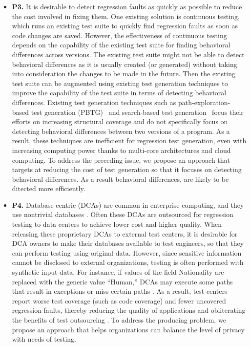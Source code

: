 \begin{itemize}
\item \textbf{P3.} It is desirable to detect regression faults as quickly as possible to reduce the cost involved in fixing them. 
One existing solution is continuous testing, which runs an existing test suite to quickly find regression faults as soon as code changes are saved. 
However, the effectiveness of continuous testing depends on the capability of the existing test suite for 
finding behavioral differences across versions. The existing test suite might not be able to detect behavioral differences as it is usually created (or generated) without taking into consideration the changes to be made in the future. Then the existing test suite can be augmented using existing test generation techniques to improve the capability of the test suite in terms of detecting behavioral differences. Existing test generation techniques
such as path-exploration-based test generation (PBTG)~\cite{cute, dart, king:symex, exe, Clarke:symbolic,JPF-symbolic, godefroid:fuzz}
and search-based test generation~\cite{eTOC, inkumsah08:improving} focus their efforts on increasing structural coverage and do not speciﬁcally focus on detecting behavioral differences between two versions of a program. As a result, these techniques are inefﬁcient for regression test generation, even with increasing computing power thanks to multi-core architectures and cloud computing. To address the preceding issue, we propose an approach that targets at reducing the cost of test generation so that it focuses on detecting behavioral differences. As a result behavioral differences, are likely to be ditected more efficiently.

\item \textbf{P4.} 
Database-centric  (DCAs) are common in enterprise computing, and they use nontrivial databases \cite{FSE11:03}. Often these DCAs are outsourced for regression testing to data centers \cite{OutsourcingRegression:11} to achieve lower cost and higher quality.
 When releasing these proprietary DCAs to external test centers, it is desirable for DCA owners to make their databases available to test engineers, so that they can perform testing using original data. However, since sensitive information cannot be disclosed to external organizations, testing is often performed with synthetic input data. For instance, if values of the ﬁeld Nationality are replaced with the generic value “Human,” DCAs may execute some paths that result in exceptions or miss certain paths \cite{TADA:10}. As a result, test centers report worse test coverage (such as code coverage) and fewer uncovered regression faults, thereby reducing the quality of applications and obliterating the beneﬁts of test outsourcing \cite{Gartner:09}. 
To address the producing problem, we propose an approach that helps organizations can balance the level of privacy with needs of testing. 
\end{itemize}



